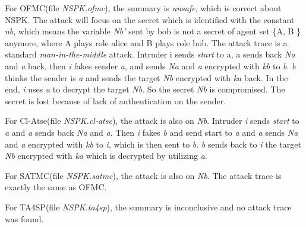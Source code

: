 \documentclass[a4paper, 12pt]{report}
\begin{document}
        For OFMC(file \emph{NSPK.ofmc}), the summary is \emph{unsafe}, which is correct about NSPK. The attack will focus on the secret which is identified with the constant \emph{nb}, which means the variable \emph{Nb'} sent by bob is not a secret of agent set \{A, B \} anymore, where A plays role alice and B plays role bob. The attack trace is a standard \emph{man-in-the-middle} attack. Intruder i sends \emph{start} to a, a sends back \emph{Na} and \emph{a} back, then
        \emph{i} fakes sender \emph{a}, and sends \emph{Na} and \emph{a} encrypted with \emph{kb} to \emph{b}. \emph{b} thinks the sender is \emph{a} and sends the target \emph{Nb} encrypted with \emph{ka} back. In the end, \emph{i} uses \emph{a} to decrypt the target \emph{Nb}. So the secret \emph{Nb} is compromised. The secret is lost because of lack of authentication on the sender.
            
        For Cl-Atse(file \emph{NSPK.cl-atse}), the attack is also on \emph{Nb}. Intruder \emph{i} sends \emph{start} to \emph{a} and \emph{a} sends back \emph{Na} and \emph{a}. Then \emph{i} fakes \emph{b} and send start to \emph{a} and \emph{a} sends \emph{Na} and \emph{a} encrypted with \emph{kb} to \emph{i}, which is then sent to \emph{b}. \emph{b} sends back to \emph{i} the target \emph{Nb} encrypted with \emph{ka} which is decrypted by utilizing \emph{a}.
            
        For SATMC(file \emph{NSPK.satmc}), the attack is also on \emph{Nb}. The attack trace is exactly the same as OFMC.
            
        For TA4SP(file \emph{NSPK.ta4sp}), the summary is inconclusive and no attack trace was found.
\end{document}
